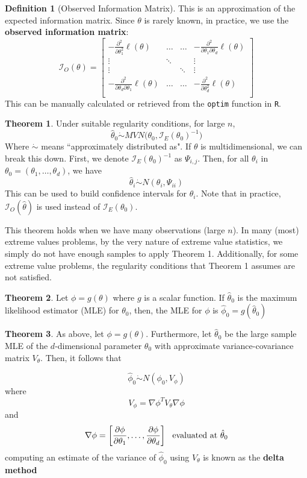 \documentclass{article}
\theoremstyle{definition}
\newtheorem{theorem}{Theorem}
\theoremstyle{definition}
\newtheorem{definition}{Definition}
\def\l{\ell}
\def\inv{^{-1}}
\def\fish{\mathcal{I}}
\newcommand{\dotrel}[1]{\mathrel{\dot{#1}}}
\begin{document}
\begin{definition}[Observed Information Matrix]
This is an approximation of the expected information matrix. Since $\theta$ is rarely known, in practice, we use the \textbf{observed information matrix}:
\[\fish_O(\theta)= 
\begin{bmatrix}-\frac{\partial^2}{\partial \theta_1^2}\l(\theta)  &\hdots &\hdots & -\frac{\partial^2}{\partial \theta_1\partial\theta_d}\l(\theta) \\
\vdots& \ddots & & \vdots\\
\vdots& &\ddots &\vdots \\
-\frac{\partial^2}{\partial \theta_d\partial\theta_1}\l(\theta) & \hdots & \hdots& -\frac{\partial^2}{\partial \theta_d^2}\l(\theta) \\
\end{bmatrix}\]
This can be manually calculated or retrieved from the \texttt{optim} function in \texttt{R}.
\end{definition}

\begin{theorem}
Under suitable regularity conditions, for large $n$, 
\[\hat{\theta}_0 \dotrel{\sim} \textit{MVN}\Big(\theta_0, \fish_{E}(\theta_0)\inv \Big)\]
Where $\dotrel{\sim}$ means ``approximately distributed as". If $\theta$ is multidimensional, we can break this down. First, we denote $\fish_{E}(\theta_0)\inv$ as $\Psi_{i,j}$. Then, for all $\theta_i$ in $\theta_0=(\theta_1,\hdots, \theta_d)$, we have 
\[\hat\theta_i\dotrel{\sim} N(\theta_i, \Psi_{ii})\]
This can be used to build confidence intervals for $\theta_i$. Note that in practice, $\fish_O(\hat{\theta})$ is used instead of $\fish_E(\theta_0)$.

This theorem holds when we have many observations (large $n$). In many (most) extreme values problems, by the very nature of extreme value statistics, we simply do not have enough samples to apply Theorem 1. Additionally, for some extreme value problems, the regularity conditions that Theorem 1 assumes are not satisfied.
\end{theorem}
\begin{theorem}
Let $\phi=g(\theta)$ where $g$ is a scalar function. If $\hat{\theta}_0$ is the maximum likelihood estimator (MLE) for $\theta_0$, then, the MLE for $\phi$ is $\hat{\phi}_0=g(\hat{\theta}_0)$
\end{theorem}

\begin{theorem}As above, let $\phi=g(\theta)$. Furthermore, let $\hat{\theta}_0$ be the large sample MLE of the $d$-dimensional parameter $\theta_0$ with approximate variance-covariance matrix $V_{\theta}$. Then, it follows that

\[\hat{\phi}_0\dotrel{\sim} N(\phi_0, V_\phi)\]
where 
\[V_\phi= \nabla \phi^T V_\theta\nabla \phi\]
and
\[\nabla\phi=\bigg[ \frac{\partial \phi}{\partial\theta_1}, \hdots,\frac{\partial \phi}{\partial\theta_d} \bigg] \hspace{.3cm} \text{evaluated at }\hat{\theta}_0\]
computing an estimate of the variance of $\hat{\phi}_0$ using $V_{\theta}$ is known as the \textbf{delta method}
\end{theorem}
\end{document}
